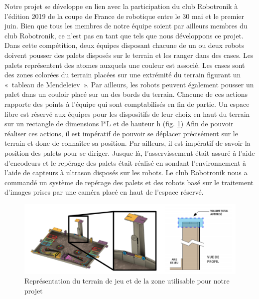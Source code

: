 \documentclass{article}
\begin{document}
Notre projet se développe en lien avec la participation du club Robotronik à l’édition 2019 de la coupe de France de robotique entre le 30 mai et le premier juin. Bien que tous les membres de notre équipe soient par ailleurs membres du club Robotronik, ce n’est pas en tant que tels que nous développons ce projet.
\newline\newline
Dans cette compétition, deux équipes disposant chacune de un ou deux robots doivent pousser des palets disposés sur le terrain et les ranger dans des cases. Les palets représentent des atomes auxquels une couleur est associé. Les cases sont des zones colorées du terrain placées sur une extrémité du terrain figurant un « tableau de Mendeleiev ». Par ailleurs, les robots peuvent également pousser un palet dans un couloir placé sur un des bords du terrain. Chacune de ces actions rapporte des points à l’équipe qui sont comptabilisés en fin de partie. Un espace libre est réservé aux équipes pour les dispositifs de leur choix en haut du terrain sur un rectangle de dimensions l*L et de hauteur h (fig. \ref{fig:terrain})\newline\newline
 Afin de pouvoir réaliser ces actions, il est impératif de pouvoir se déplacer précisément sur le terrain et donc de connaître sa position. Par ailleurs, il est impératif de savoir la position des palets pour se diriger. Jusque là, l’asservissement était assuré à l’aide d’encodeurs et le repérage des palets était réalisé en sondant l’environnement à l’aide de capteurs à ultrason disposés sur les robots. Le club Robotronik nous a commandé un système de repérage des palets et des robots basé sur le traitement d’images prises par une caméra placé en haut de l’espace réservé.
 
\begin{figure}[ht]
    \centering
    \includegraphics[scale = 0.3]{ImageTerrain}
    \caption{Représentation du terrain de jeu et de la zone utilisable pour notre projet}
    \label{fig:terrain}
\end{figure}
\end{document}
